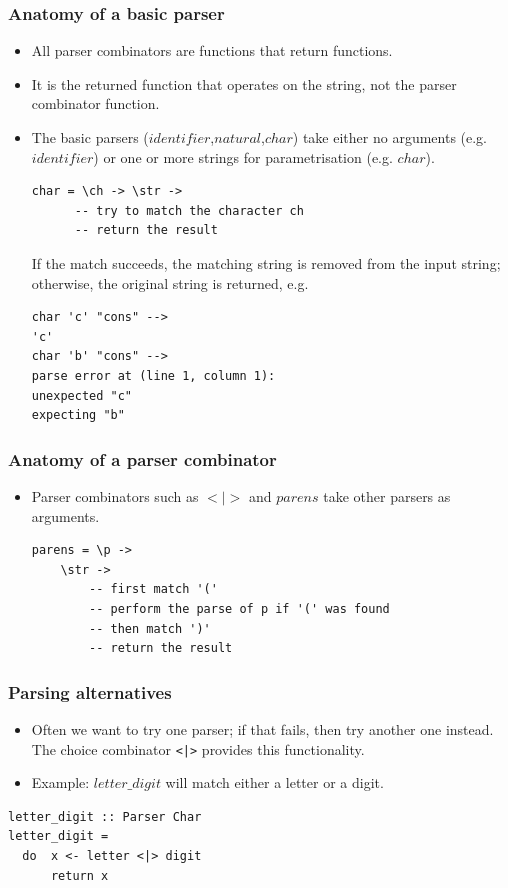 \documentclass{beamer}
\begin{document}
\begin{frame}[fragile]
\frametitle{Anatomy of a basic parser}

\begin{itemize}
\item All parser combinators are functions that return functions.
\item It is the returned function that operates on the string, not the parser combinator function.
\item The basic parsers ($identifier$,$natural$,$char$) take either no arguments (e.g. $identifier$) or one or more strings for parametrisation (e.g. $char$). 

\begin{verbatim}
char = \ch -> \str ->
      -- try to match the character ch
      -- return the result
\end{verbatim}
If the match succeeds, the matching string is removed from the input string; otherwise, the original string is returned, e.g.
\begin{verbatim}
char 'c' "cons" -->
'c'
char 'b' "cons" --> 
parse error at (line 1, column 1):
unexpected "c"
expecting "b"
\end{verbatim}
\end{itemize}   
\end{frame}

\begin{frame}[fragile]
\frametitle{Anatomy of a parser combinator}

\begin{itemize}
\item Parser combinators such as $<|>$ and $parens$ take other parsers as arguments. 

\begin{verbatim}
parens = \p ->
    \str ->
        -- first match '('
        -- perform the parse of p if '(' was found
        -- then match ')'
        -- return the result
\end{verbatim}

\end{itemize}   
\end{frame}


\begin{frame}[fragile]
\frametitle{Parsing alternatives}

\begin{itemize}
\item Often we want to try one parser; if that fails, then try
  another one instead. The choice combinator \texttt{<|>} provides this functionality. 
\item Example: $letter\_digit$ will match either a letter or a
  digit.

\end{itemize}


\begin{verbatim}
letter_digit :: Parser Char
letter_digit =
  do  x <- letter <|> digit
      return x
\end{verbatim}

\end{frame}
\end{document}
